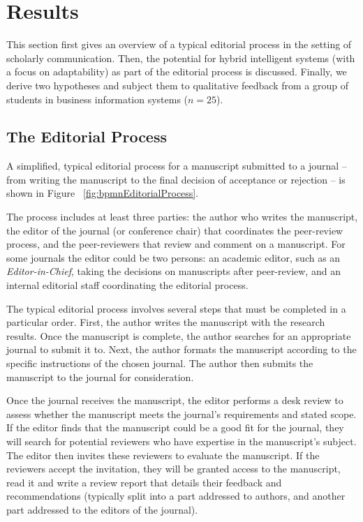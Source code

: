 \section{Results}
\label{sec:results}

This section first gives an overview of a typical editorial process in the setting of scholarly communication. Then, the potential
for hybrid intelligent systems (with a focus on adaptability) as part of the editorial process is discussed. Finally, we derive two
hypotheses and subject them to qualitative feedback from a group of students in business information systems ($n = 25$).

\subsection{The Editorial Process}

A simplified, typical editorial process for a manuscript submitted to a journal -- from writing the manuscript to the final decision of
acceptance or rejection -- is shown in Figure ~\ref{fig:bpmnEditorialProcess}.

The process includes at least three parties: the author who
writes the manuscript, the editor of the journal (or conference chair) that coordinates the peer-review process, and the peer-reviewers
that review and comment on a manuscript. For some journals the editor could be two persons: an academic editor, such as an \textit{Editor-in-Chief},
taking the decisions on manuscripts after peer-review, and an internal editorial staff coordinating the editorial process.

The typical editorial process involves several steps that must be completed in a particular order. First, the author writes the manuscript
with the research results. Once the manuscript is complete, the author searches for an appropriate journal to submit it to. Next, the author
formats the manuscript according to the specific instructions of the chosen journal. The author then submits the manuscript to the journal
for consideration. 

Once the journal receives the manuscript, the editor performs a desk review to assess whether the manuscript meets the journal's requirements
and stated scope. If the editor finds that the manuscript could be a good fit for the journal, they will search for potential reviewers who
have expertise in the manuscript's subject. The editor then invites these reviewers to evaluate the manuscript.
If the reviewers accept the invitation, they will be granted access to the manuscript, read it and write a review report that details their
feedback and recommendations (typically split into a part addressed to authors, and another part addressed to the editors of the journal). 

